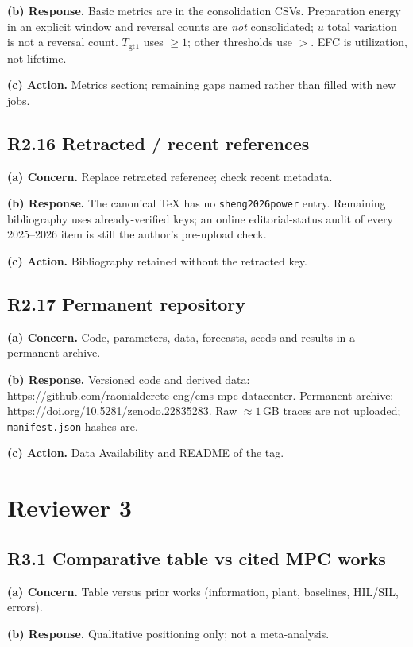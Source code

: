 \documentclass[11pt]{article}
\newcommand{\repgithub}{https://github.com/raonialderete-eng/ems-mpc-datacenter}
\newcommand{\repzenodo}{10.5281/zenodo.22835283}
\begin{document}
\textbf{(b) Response.} Basic metrics are in the consolidation CSVs. Preparation energy in an explicit window and reversal counts are \emph{not} consolidated; $u$ total variation is not a reversal count. $T_{\mathrm{gt1}}$ uses $\ge 1$; other thresholds use $>$. EFC is utilization, not lifetime.

\textbf{(c) Action.} Metrics section; remaining gaps named rather than filled with new jobs.

\subsection*{R2.16 Retracted / recent references}
\textbf{(a) Concern.} Replace retracted reference; check recent metadata.

\textbf{(b) Response.} The canonical TeX has no \texttt{sheng2026power} entry. Remaining bibliography uses already-verified keys; an online editorial-status audit of every 2025--2026 item is still the author's pre-upload check.

\textbf{(c) Action.} Bibliography retained without the retracted key.

\subsection*{R2.17 Permanent repository}
\textbf{(a) Concern.} Code, parameters, data, forecasts, seeds and results in a permanent archive.

\textbf{(b) Response.} Versioned code and derived data: \url{\repgithub}. Permanent archive: \url{https://doi.org/\repzenodo}. Raw $\approx 1$\,GB traces are not uploaded; \texttt{manifest.json} hashes are.

\textbf{(c) Action.} Data Availability and README of the tag.

\section*{Reviewer 3}

\subsection*{R3.1 Comparative table vs cited MPC works}
\textbf{(a) Concern.} Table versus prior works (information, plant, baselines, HIL/SIL, errors).

\textbf{(b) Response.} Qualitative positioning only; not a meta-analysis.
\end{document}
